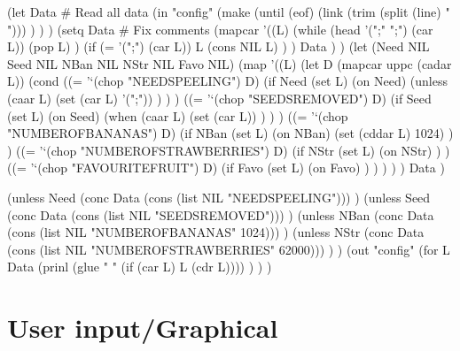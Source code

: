 \begin{wideverbatim}

(let Data  # Read all data
   (in "config"
      (make
         (until (eof)
            (link (trim (split (line) " "))) ) ) )
   (setq Data  # Fix comments
      (mapcar
         '((L)
            (while (head '(";" ";") (car L))
               (pop L) )
            (if (= '(";") (car L))
               L
               (cons NIL L) ) )
         Data ) )
   (let (Need NIL  Seed NIL  NBan NIL  NStr NIL  Favo NIL)
      (map
         '((L)
            (let D (mapcar uppc (cadar L))
               (cond
                  ((= '`(chop "NEEDSPEELING") D)
                     (if Need
                        (set L)
                        (on Need)
                        (unless (caar L)
                           (set (car L) '(";")) ) ) )
                  ((= '`(chop "SEEDSREMOVED") D)
                     (if Seed
                        (set L)
                        (on Seed)
                        (when (caar L)
                           (set (car L)) ) ) )
                  ((= '`(chop "NUMBEROFBANANAS") D)
                     (if NBan
                        (set L)
                        (on NBan)
                        (set (cddar L) 1024) ) )
                  ((= '`(chop "NUMBEROFSTRAWBERRIES") D)
                     (if NStr
                        (set L)
                        (on NStr) ) )
                  ((= '`(chop "FAVOURITEFRUIT") D)
                     (if Favo
                        (set L)
                        (on Favo) ) ) ) ) )
         Data )

\end{wideverbatim}

\begin{wideverbatim}

      (unless Need
         (conc Data (cons (list NIL "NEEDSPEELING"))) )
      (unless Seed
         (conc Data (cons (list NIL "SEEDSREMOVED"))) )
      (unless NBan
         (conc Data (cons (list NIL "NUMBEROFBANANAS" 1024))) )
      (unless NStr
         (conc Data (cons (list NIL "NUMBEROFSTRAWBERRIES" 62000))) ) )
   (out "config"
      (for L Data
         (prinl (glue " " (if (car L) L (cdr L)))) ) ) )

\end{wideverbatim}

\pagebreak{}
\section*{User input/Graphical}

